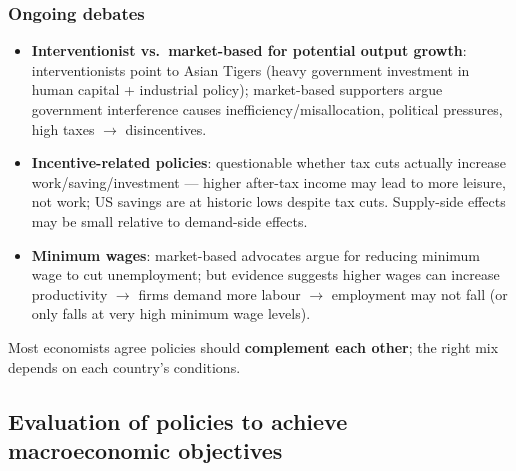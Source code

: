 \subsubsection*{Ongoing debates}
\begin{itemize}
  \item \textbf{Interventionist vs.\ market-based for potential output growth}: interventionists point to Asian Tigers (heavy government investment in human capital + industrial policy); market-based supporters argue government interference causes inefficiency/misallocation, political pressures, high taxes $\to$ disincentives.
  \item \textbf{Incentive-related policies}: questionable whether tax cuts actually increase work/saving/investment --- higher after-tax income may lead to more leisure, not work; US savings are at historic lows despite tax cuts. Supply-side effects may be small relative to demand-side effects.
  \item \textbf{Minimum wages}: market-based advocates argue for reducing minimum wage to cut unemployment; but evidence suggests higher wages can increase productivity $\to$ firms demand more labour $\to$ employment may not fall (or only falls at very high minimum wage levels).
\end{itemize}
Most economists agree policies should \textbf{complement each other}; the right mix depends on each country's conditions.

\subsection{Evaluation of policies to achieve macroeconomic objectives}

